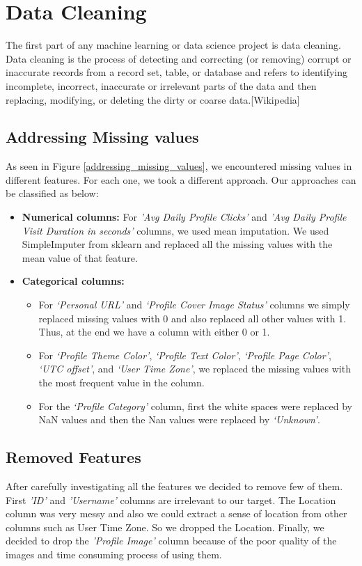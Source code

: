 \documentclass[sigplan,screen]{acmart}
\begin{document}
\section{Data Cleaning}
The first part of any machine learning or data science project is data cleaning. Data cleaning is the process of detecting and correcting (or removing) corrupt or inaccurate records from a record set, table, or database and refers to identifying incomplete, incorrect, inaccurate or irrelevant parts of the data and then replacing, modifying, or deleting the dirty or coarse data.[Wikipedia]

\subsection{Addressing Missing values}

As seen in Figure \ref{addressing_missing_values}, we encountered missing values in different features.  For each one, we took a different approach. Our approaches can be classified as below:
\begin{itemize}
    \item 
    \textbf{Numerical columns:}
    For \textit{'Avg Daily Profile Clicks'} and \textit{'Avg Daily Profile Visit Duration in seconds'} columns, we used mean imputation. We used SimpleImputer from sklearn and replaced all the missing values with the mean value of that feature.
    \item
    \textbf{Categorical columns:}
    \begin{itemize}
        \item 
        For \textit{‘Personal URL’} and \textit{‘Profile Cover Image Status’} columns we simply replaced missing values with 0 and also replaced all other values with 1. Thus, at the end we have a column with either 0 or 1.
        \item
        For \textit{‘Profile Theme Color’}, \textit{‘Profile Text Color'}, \textit{‘Profile Page Color’}, \textit{‘UTC offset’}, and\textit{ ‘User Time Zone’}, we replaced the missing values with the most frequent value in the column.
        \item
        For the \textit{‘Profile Category’} column, first the white spaces were replaced by NaN values and then the Nan values were replaced by \textit{‘Unknown'}.
    \end{itemize}
\end{itemize}

\subsection{Removed Features}
After carefully investigating all the features we decided to remove few of them. First \textit{'ID'} and \textit{'Username'} columns are irrelevant to our target. The Location column was very messy and also we could extract a sense of location from other columns such as User Time Zone. So we dropped the Location. Finally, we decided to drop the \textit{'Profile Image'} column because of the poor quality of the images and time consuming process of using them.
\end{document}
